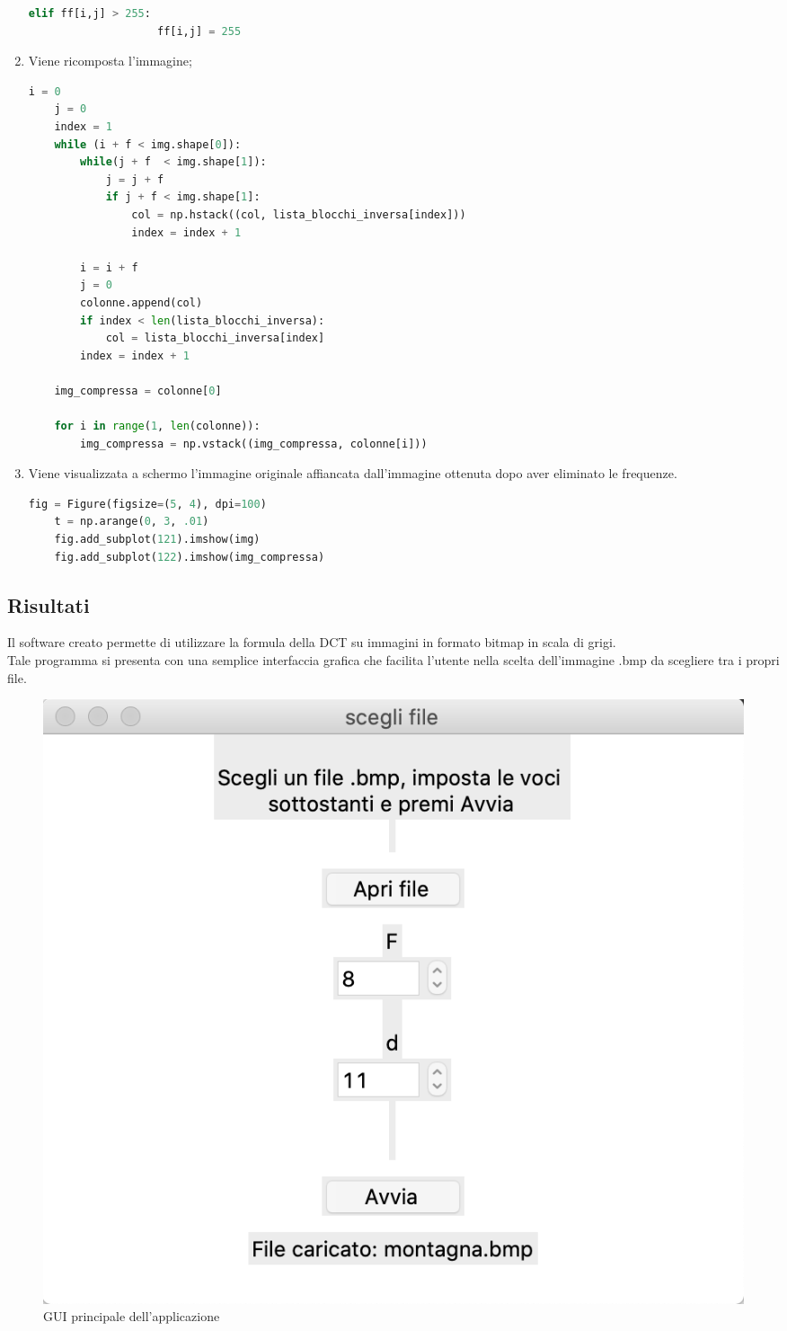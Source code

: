 \documentclass[preprint,12pt]{elsarticle}
\begin{document}
\begin{enumerate}
\begin{lstlisting}[language=Python]
                elif ff[i,j] > 255:
                    ff[i,j] = 255
\end{lstlisting}
\newpage
\item Viene ricomposta l'immagine;
\begin{lstlisting}[language=Python]
    i = 0
    j = 0
    index = 1
    while (i + f < img.shape[0]):
        while(j + f  < img.shape[1]):
            j = j + f
            if j + f < img.shape[1]:
                col = np.hstack((col, lista_blocchi_inversa[index]))
                index = index + 1

        i = i + f
        j = 0
        colonne.append(col)
        if index < len(lista_blocchi_inversa):
            col = lista_blocchi_inversa[index]
        index = index + 1

    img_compressa = colonne[0]

    for i in range(1, len(colonne)):
        img_compressa = np.vstack((img_compressa, colonne[i]))
\end{lstlisting}

\item Viene visualizzata a schermo l'immagine originale affiancata dall'immagine ottenuta dopo aver eliminato le frequenze.
\begin{lstlisting}[language=Python]    
    fig = Figure(figsize=(5, 4), dpi=100)
    t = np.arange(0, 3, .01)
    fig.add_subplot(121).imshow(img)
    fig.add_subplot(122).imshow(img_compressa)
\end{lstlisting}

\end{enumerate}

\newpage

\subsection*{Risultati}
Il software creato permette di utilizzare la formula della DCT su immagini in formato bitmap in scala di grigi.\\
Tale programma si presenta con una semplice interfaccia grafica che facilita l'utente nella scelta dell'immagine .bmp da scegliere tra i propri file.

\begin{figure}[H]
	\centering
	\includegraphics[width=0.5\linewidth]{gui}
	\caption{GUI principale dell'applicazione}
\end{figure}
\end{document}
